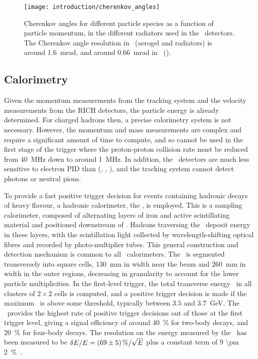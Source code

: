 \begin{figure}
  \centering
  \texttt{[image: introduction/cherenkov\_angles]}
  \caption{%
    Cherenkov angles for different particle species as a function of particle 
    momentum, in the different radiators used in the \rich\ detectors.
    The Cherenkov angle resolution in \richone~(aerogel and  
    radiators) is around \SI{1.6}{\milli\radian}, and around 
    \SI{0.66}{\milli\radian} in \richtwo~().
  }
  \label{fig:intro:lhcb:cherenkov_angles}
\end{figure}

\subsection{Calorimetry}
\label{chap:intro:lhcb:detector:calo}

Given the momentum measurements from the tracking system and the velocity 
measurements from the \ac{RICH} detectors, the particle energy is already 
determined.
For charged hadrons then, a precise calorimetry system is not necessary.
However, the momentum and mass measurements are complex and require a 
significant amount of time to compute, and so cannot be used in the first stage 
of the trigger where the proton-proton collision rate must be reduced from 
\SI{40}{\mega\hertz} down to around \SI{1}{\mega\hertz}.
In addition, the \rich\ detectors are much less sensitive to electron \ac{PID} 
than (\Ppi, \PK, \Pproton), and the tracking system cannot detect photons or 
neutral pions.

To provide a fast positive trigger decision for events containing hadronic 
decays of heavy flavour, a hadronic calorimeter, the \hcal, is employed.
This is a sampling calorimeter, composed of alternating layers of iron and 
active scintillating material and positioned downstream of \richtwo.
Hadrons traversing the \hcal\ deposit energy in these layers, with the 
scintillation light collected by wavelength-shifting optical fibres and 
recorded by photo-multiplier tubes.
This general construction and detection mechanism is common to all \lhcb\ 
calorimeters.
The \hcal\ is segmented transversely into square cells, \SI{130}{\milli\metre} 
in width near the beam and \SI{260}{\milli\metre} in width in the outer 
regions, decreasing in granularity to account for the lower particle 
multiplicities.
In the first-level trigger, the total transverse energy \ET\ in all clusters of 
$2\times2$ cells is computed, and a positive trigger decision is made if the 
maximum \ET\ is above some threshold, typically between $3.5$ and 
\SI{3.7}{\GeV}.
The \hcal\ provides the highest rate of positive trigger decisions out of those 
at the first trigger level, giving a signal efficiency of around 
\SI{40}{\percent} for two-body \PB decays, and \SI{20}{\percent} for four-body 
\PD decays.
The resolution on the energy measured by the \hcal\ has been measured to be 
$\unc{E}/E = \SI{69 \pm 5}{\percent}/\sqrt{E}$ plus a constant term of \SI{9 
  \pm 2}{\percent}~\cite{Perret:2015pla}.

